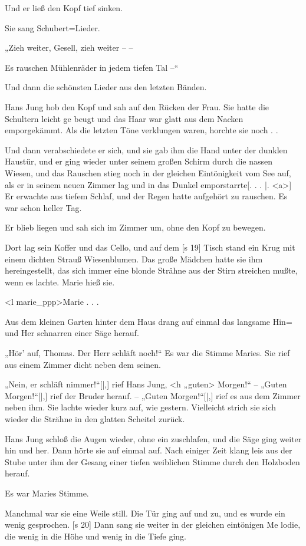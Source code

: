 Und er ließ den Kopf tief sinken.

Sie sang Schubert=Lieder.

„Zieh weiter, Gesell, zieh weiter – –

Es rauschen Mühlenräder in jedem tiefen Tal –“

Und dann die schönsten Lieder aus den letzten
Bänden.

Hans Jung hob den Kopf und sah auf den
Rücken der Frau. Sie hatte die Schultern leicht ge­
beugt und das Haar war glatt aus dem Nacken
emporgekämmt. Als die letzten Töne verklungen
waren, horchte sie noch . .

Und dann verabschiedete er sich, und sie gab
ihm die Hand unter der dunklen Haustür, und er
ging wieder unter seinem großen Schirm durch die
nassen Wiesen, und das Rauschen stieg noch in der
gleichen Eintönigkeit vom See auf, als er in seinem
neuen Zimmer lag und in das Dunkel emporstarrte[. . .
|.
<a>]
Er erwachte aus tiefem Schlaf, und der Regen
hatte aufgehört zu rauschen. Es war schon heller Tag.

Er blieb liegen und sah sich im Zimmer um,
ohne den Kopf zu bewegen.

Dort lag sein Koffer und das Cello, und auf dem
[s 19]
Tisch stand ein Krug mit einem dichten Strauß
Wiesenblumen. Das große Mädchen hatte sie ihm
hereingestellt, das sich immer eine blonde Strähne
aus der Stirn streichen mußte, wenn es lachte. Marie
hieß sie.

<l marie_ppp>Marie . . .

Aus dem kleinen Garten hinter dem Haus
drang auf einmal das langsame Hin= und Her­
schnarren einer Säge herauf.

„Hör' auf, Thomas. Der Herr schläft noch!“
Es war die Stimme Maries. Sie rief aus einem
Zimmer dicht neben dem seinen.

„Nein, er schläft nimmer!“[|,] rief Hans Jung,
<h „guten> Mor­gen!“ – „Guten Morgen!“[|,] rief der
Bruder her­auf. – „Guten Morgen!“[|,] rief es aus dem
Zimmer neben ihm. Sie lachte wieder kurz auf, wie
gestern. Vielleicht strich sie sich wieder die Strähne
in den glatten Scheitel zurück.

Hans Jung schloß die Augen wieder, ohne ein­
zuschlafen, und die Säge ging weiter hin und her.
Dann hörte sie auf einmal auf. Nach einiger Zeit
klang leis aus der Stube unter ihm der Gesang einer
tiefen weiblichen Stimme durch den Holzboden herauf.

Es war Maries Stimme.

Manchmal war sie eine Weile still. Die Tür
ging auf und zu, und es wurde ein wenig gesprochen.
[s 20]
Dann sang sie weiter in der gleichen eintönigen Me­
lodie, die wenig in die Höhe und wenig in die
Tiefe ging.

